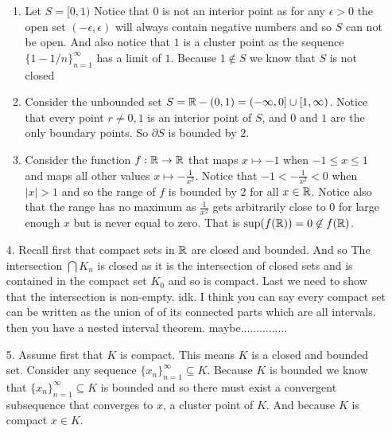 \documentclass[12pt]{amsart}
\begin{document}
\begin{itemize}
\begin{enumerate}
            \item Let $S=[0,1)$ Notice that $0$ is not an interior point as for any $\epsilon>0$
                  the open set $(-\epsilon,\epsilon)$ will always contain negative numbers and so
                  $S$ can not be open. And also notice that $1$ is a cluster point as the
                  sequence $\{1-1/n\}_{n=1}^\infty$ has a limit of $1$. Because $1\not\in S$ we
                  know that $S$ is not closed

            \item Consider the unbounded set $S=\mathbb{R}-(0,1)=(-\infty,0]\cup [1,\infty)$. Notice that
                  every point $r\neq 0,1$ is an interior point of $S$, and $0$ and $1$ are the
                  only boundary points. So $\partial S$ is bounded by $2$.

            \item Consider the function $f:\mathbb{R}\rightarrow\mathbb{R}$ that maps $x\mapsto -1$ when $-1\leq x\leq 1$
                  and maps all other values $x\mapsto -\frac{1}{x^2}$. Notice that
                  $-1<-\frac{1}{x^2}<0$ when $|x|>1$ and so the range of $f$ is bounded by $2$
                  for all $x\in \mathbb{R}$. Notice also that the range has no maximum as $\frac{1}{x^2}$
                  gets arbitrarily close to $0$ for large enough $x$ but is never equal to zero.
                  That is $\sup(f(\mathbb{R}))=0\not\in f(\mathbb{R})$.
        \end{enumerate}

    \item[4.] Recall first that compact sets in $\mathbb{R}$ are closed and bounded. And so The
        intersection $\bigcap K_n$ is closed as it is the intersection of closed sets
        and is contained in the compact set $K_0$ and so is compact. Last we need to
        show that the intersection is non-empty.
         idk. I think you can say every
        compact set can be written as the union of of its connected parts which are all
        intervals. then you have a nested interval theorem. maybe...............%

    \item[5.] Assume first that $K$ is compact. This means $K$ is a closed and bounded set.
        Consider any sequence $\{x_n\}_{n=1}^\infty\subseteq K$. Because $K$ is bounded we
        know that $\{x_n\}_{n=1}^\infty\subseteq K$ is bounded and so there must exist a
        convergent subsequence that converges to $x$, a cluster point of $K$. And
        because $K$ is compact $x\in K$.


\end{itemize}
\end{document}
